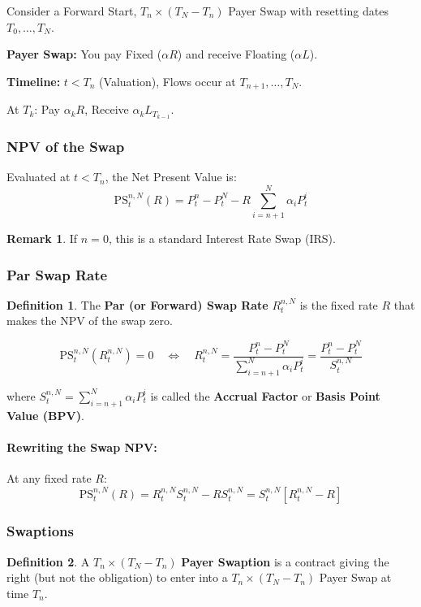 \documentclass[12pt,a4paper]{article}
\theoremstyle{definition}
\newtheorem{definition}{Definition}[section]
\newtheorem{remark}{Remark}[section]
\begin{document}
Consider a Forward Start, $T_n \times (T_N - T_n)$ Payer Swap with resetting dates $T_0, \ldots, T_N$.

\textbf{Payer Swap:} You pay Fixed ($\alpha R$) and receive Floating ($\alpha L$).

\textbf{Timeline:} $t < T_n$ (Valuation), Flows occur at $T_{n+1}, \ldots, T_N$.

At $T_k$: Pay $\alpha_k R$, Receive $\alpha_k L_{T_{k-1}}$.

\subsubsection{NPV of the Swap}

Evaluated at $t < T_n$, the Net Present Value is:
\[
\text{PS}_t^{n,N}(R) = P_t^n - P_t^N - R\sum_{i=n+1}^N \alpha_i P_t^i
\]

\begin{remark}
If $n = 0$, this is a standard Interest Rate Swap (IRS).
\end{remark}

\subsubsection{Par Swap Rate}

\begin{definition}
The \textbf{Par (or Forward) Swap Rate} $R_t^{n,N}$ is the fixed rate $R$ that makes the NPV of the swap zero.
\end{definition}

\[
\text{PS}_t^{n,N}(R_t^{n,N}) = 0 \quad \Longleftrightarrow \quad R_t^{n,N} = \frac{P_t^n - P_t^N}{\sum_{i=n+1}^N \alpha_i P_t^i} = \frac{P_t^n - P_t^N}{S_t^{n,N}}
\]

where $S_t^{n,N} = \sum_{i=n+1}^N \alpha_i P_t^i$ is called the \textbf{Accrual Factor} or \textbf{Basis Point Value (BPV)}.

\paragraph{Rewriting the Swap NPV:} 

At any fixed rate $R$:
\[
\text{PS}_t^{n,N}(R) = R_t^{n,N} S_t^{n,N} - RS_t^{n,N} = S_t^{n,N}[R_t^{n,N} - R]
\]

\subsubsection{Swaptions}

\begin{definition}
A $T_n \times (T_N - T_n)$ \textbf{Payer Swaption} is a contract giving the right (but not the obligation) to enter into a $T_n \times (T_N - T_n)$ Payer Swap at time $T_n$.
\end{definition}
\end{document}
